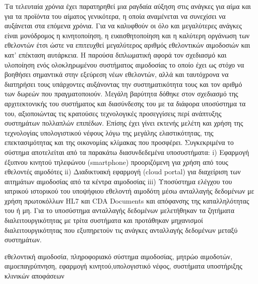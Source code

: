 \begin{abstractgr}
	Τα τελευταία χρόνια έχει παρατηρηθεί μια ραγδαία αύξηση στις ανάγκες για αίμα και για τα προϊόντα του αίματος γενικότερα, η οποία αναμένεται να συνεχίσει να αυξάνεται στα επόμενα χρόνια. Για να καλυφθούν οι όλο και μεγαλύτερες ανάγκες είναι μονόδρομος η κινητοποίηση, η ευαισθητοποίηση και η καλύτερη οργάνωση των εθελοντών έτσι ώστε να επιτευχθεί μεγαλύτερος αριθμός εθελοντικών αιμοδοσιών και κατ' επέκταση αυτάρκεια. Η παρούσα διπλωματική αφορά τον σχεδιασμό και υλοποίηση ενός ολοκληρωμένου συστήματος αιμοδοσίας το οποίο έχει ως στόχο να βοηθήσει σημαντικά στην εξεύρεση νέων εθελοντών, αλλά και ταυτόχρονα να διατηρήσει τους υπάρχοντες αυξάνοντας την συστηματικότητα τους και τον αριθμό των δωρεών που πραγματοποιούν. Μεγάλη βαρύτητα δόθηκε στον σχεδιασμό της αρχιτεκτονικής του συστήματος και διασύνδεσης του με τα διάφορα υποσύστημα τα του, αξιοποιώντας τις κρατούσες τεχνολογικές προσεγγίσεις περί ανάπτυξης συστημάτων πολλαπλών επιπέδων. Επίσης έχει γίνει εκτενής μελέτη και χρήση της τεχνολογίας υπολογιστικού νέφους λόγω της μεγάλης ελαστικότητας, της επεκτασιμότητας και της οικονομίας κλίμακας που προσφέρει.  Συγκεκριμένα το σύστημα αποτελείται από τα παρακάτω διασυνδεδεμένα υποσυστήματα: i) Εφαρμογή έξυπνου κινητού τηλεφώνου (smartphone) προοριζόμενη για χρήση από τους εθελοντές αιμοδότες ii) Διαδικτυακή εφαρμογή (cloud portal) για διαχείριση των αιτημάτων αιμοδοσίας από τα κέντρα αιμοδοσίας  iii) Υποσύστημα ελέγχου του ιατρικού ιστορικού  του υποψήφιου εθελοντή αιμοδότη μέσω ανταλλαγής δεδομένων με χρήση πρωτοκόλλων HL7 και CDA Documents και απόφανσης της καταλληλότητας του ή μη. Για το υποσύστημα ανταλλαγής δεδομένων μελετήθηκαν τα ζητήματα διαλειτουργικότητας με τρίτα συστήματα και προτάθηκαν μηχανισμοί διαλειτουργικότητας που εξυπηρετούν τις ανάγκες ανταλλαγής δεδομένων μεταξύ συστημάτων.
    \begin{keywordsgr}
		εθελοντική αιμοδοσία, πληροφοριακό σύστημα αιμοδοσίας, μητρώο αιμοδοτών, αιμοεπαγρύπνηση, εφαρμογή κινητού,υπολογιστικό νέφος, συστήματα υποστήριξης κλινικών αποφάσεων
	\end{keywordsgr}
\end{abstractgr}

